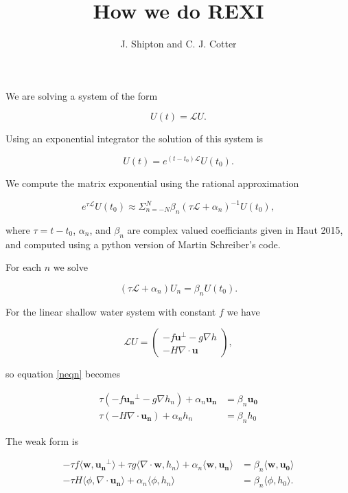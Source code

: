 \documentclass[14pt]{article}
\title{How we do REXI}
\author{J. Shipton and C. J. Cotter}
\def\MM#1{\boldsymbol{#1}}
\begin{document}
\maketitle
We are solving a system of the form

\begin{equation}
U(t) = \mathcal{L}U.
\end{equation}

Using an exponential integrator the solution of this system is

\begin{equation}
U(t) = e^{(t-t_0)\mathcal{L}}U(t_0).
\end{equation}

We compute the matrix exponential using the rational approximation

\begin{equation}
  e^{\tau\mathcal{L}}U(t_0) \approx \Sigma_{n=-N}^N\beta_n(\tau\mathcal{L} + \alpha_n)^{-1}U(t_0),
\end{equation}

\noindent where $\tau = t-t_0$, $\alpha_n$, and $\beta_n$ are complex
valued coefficiants given in Haut 2015, and computed using a python
version of Martin Schreiber's code.

For each $n$ we solve

\begin{equation}\label{neqn}
(\tau\mathcal{L} + \alpha_n)U_n = \beta_nU(t_0).
\end{equation}

For the linear shallow water system with constant $f$ we have

\begin{equation}
  \mathcal{L}U =
  \begin{pmatrix}
    -f\MM{u}^\perp - g\nabla h \\
    -H\nabla\cdot\MM{u}
  \end{pmatrix},
\end{equation}

\noindent so equation \ref{neqn} becomes

\begin{align}
  \tau(-f\MM{u_n}^\perp - g\nabla h_n) + \alpha_n\MM{u_n} &= \beta_n\MM{u_0}\\
  \tau(-H\nabla\cdot\MM{u_n}) + \alpha_nh_n &= \beta_nh_0
\end{align}

The weak form is

\begin{align}
  -\tau f\langle\MM{w}, \MM{u_n}^\perp\rangle + \tau g\langle\nabla\cdot\MM{w}, h_n\rangle + \alpha_n\langle\MM{w}, \MM{u_n}\rangle &= \beta_n\langle\MM{w}, \MM{u_0}\rangle \label{weak u}\\
  -\tau H\langle\phi, \nabla\cdot\MM{u_n}\rangle + \alpha_n\langle\phi, h_n\rangle &= \beta_n\langle\phi, h_0\rangle. \label{weak h}
\end{align}
\end{document}
